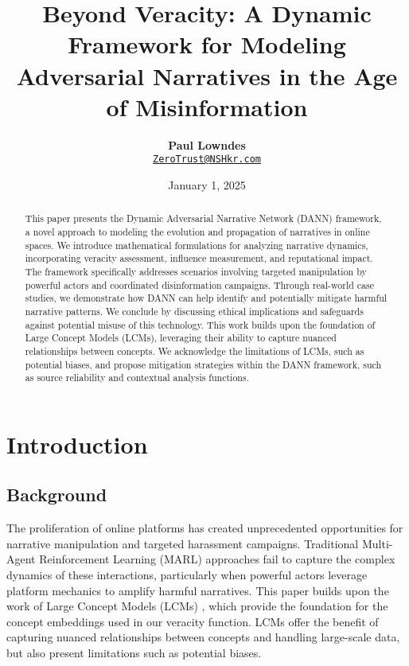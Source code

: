 \documentclass[12pt, a4paper]{article}
\title{\vspace{-2cm}\textbf{Beyond Veracity: A Dynamic Framework for Modeling Adversarial Narratives in the Age of Misinformation}}
\author{\textbf{Paul Lowndes} \\ \href{mailto:ZeroTrust@NSHkr.com}{\texttt{ZeroTrust@NSHkr.com}}}
\date{\small January 1, 2025}
\begin{document}
\maketitle
\vspace{-1.5em}


\begin{abstract}
This paper presents the Dynamic Adversarial Narrative Network (DANN) framework, a novel approach to modeling the evolution and propagation of narratives in online spaces. We introduce mathematical formulations for analyzing narrative dynamics, incorporating veracity assessment, influence measurement, and reputational impact. The framework specifically addresses scenarios involving targeted manipulation by powerful actors and coordinated disinformation campaigns. Through real-world case studies, we demonstrate how DANN can help identify and potentially mitigate harmful narrative patterns. We conclude by discussing ethical implications and safeguards against potential misuse of this technology. This work builds upon the foundation of Large Concept Models (LCMs), leveraging their ability to capture nuanced relationships between concepts. We acknowledge the limitations of LCMs, such as potential biases, and propose mitigation strategies within the DANN framework, such as source reliability and contextual analysis functions.
\end{abstract}


\section{Introduction}
\subsection{Background}
The proliferation of online platforms has created unprecedented opportunities for narrative manipulation and targeted harassment campaigns. Traditional Multi-Agent Reinforcement Learning (MARL) approaches fail to capture the complex dynamics of these interactions, particularly when powerful actors leverage platform mechanics to amplify harmful narratives. This paper builds upon the work of Large Concept Models (LCMs) \cite{lcm_paper}, which provide the foundation for the concept embeddings used in our veracity function. LCMs offer the benefit of capturing nuanced relationships between concepts and handling large-scale data, but also present limitations such as potential biases.
\end{document}
